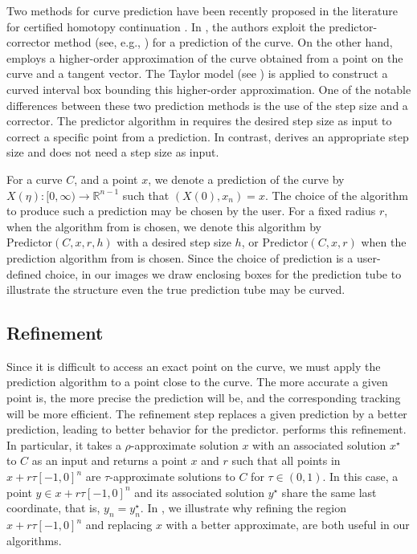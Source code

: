 Two methods for curve prediction have been recently proposed in the literature for certified homotopy continuation \cite{duff2024certified,guillemot2024validated}.  In \cite[Algorithm 2]{duff2024certified}, the authors exploit the predictor-corrector method (see, e.g., \cite[Section 2.3]{sommese2005numerical}) for a prediction of the curve.  On the other hand, \cite[Section 6.3]{guillemot2024validated} employs a higher-order approximation of the curve obtained from a point on the curve and a tangent vector. The Taylor model (see \cite[Section 9.3]{moore2009introduction}) is applied to construct a curved interval box bounding this higher-order approximation.  One of the notable differences between these two prediction methods is the use of the step size and a corrector. The predictor algorithm in \cite{duff2024certified} requires the desired step size as input to correct a specific point from a prediction. In contrast, \cite{guillemot2024validated} derives an appropriate step size and does not need a step size as input. 

For a curve $C$, and a point $x$, we denote a prediction of the curve by $X(\eta):[0,\infty)\rightarrow \mathbb{R}^{n-1}$ such that $(X(0),x_n)=x$. The choice of the algorithm to produce such a prediction may be chosen by the user. For a fixed radius $r$, when the algorithm from \cite{duff2024certified} is chosen, we denote this algorithm by $\text{Predictor}(C,x,r,h)$ with a desired step size $h$, or $\text{Predictor}(C,x,r)$ when the prediction algorithm from \cite{guillemot2024validated} is chosen.  Since the choice of prediction is a user-defined choice, in our images we draw enclosing boxes for the prediction tube to illustrate the structure even the true prediction tube may be curved.

\subsection{Refinement}

Since it is difficult to access an exact point on the curve, we must apply the prediction algorithm to a point close to the curve.  The more accurate a given point is, the more precise the prediction will be, and the corresponding tracking will be more efficient.  The refinement step replaces a given prediction by a better prediction, leading to better behavior for the predictor.   performs this refinement.  In particular, it takes a $\rho$-approximate solution $x$ with an associated solution $x^\star$ to $C$ as an input and returns a point $x$ and $r$ such that all points in $x+r\tau[-1,0]^n$ are $\tau$-approximate solutions to $C$ for $\tau\in (0,1)$. In this case, a point $y\in x+r\tau[-1,0]^n$ and its associated solution $y^\star$ share the same last coordinate, that is, $y_n=y_n^\star$.  In , we illustrate why refining the region $x+r\tau[-1,0]^n$ and replacing $x$ with a better approximate, are both useful in our algorithms.

